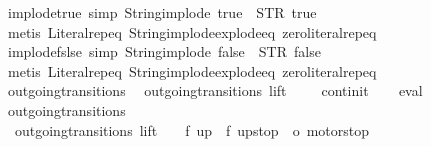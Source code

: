 \begin{isabellebody}
\ implode{\isacharunderscore}true\ {\isacharbrackleft}simp{\isacharbrackright}{\isacharcolon}\ {\isachardoublequoteopen}String{\isachardot}implode\ {\isacharprime}{\isacharprime}true{\isacharprime}{\isacharprime}\ {\isacharequal}\ STR\ {\isacharprime}{\isacharprime}true{\isacharprime}{\isacharprime}{\isachardoublequoteclose}\isanewline
%
\isadelimproof
\ \ %
\endisadelimproof
%
\isatagproof
{}\isamarkupfalse%
\ {\isacharparenleft}metis\ Literal{\isachardot}rep{\isacharunderscore}eq\ String{\isachardot}implode{\isacharunderscore}explode{\isacharunderscore}eq\ zero{\isacharunderscore}literal{\isachardot}rep{\isacharunderscore}eq{\isacharparenright}%
\endisatagproof
{\isafoldproof}%
%
\isadelimproof
\isanewline
%
\endisadelimproof
\isanewline
{}\isamarkupfalse%
\ implode{\isacharunderscore}fslse\ {\isacharbrackleft}simp{\isacharbrackright}{\isacharcolon}\ {\isachardoublequoteopen}String{\isachardot}implode\ {\isacharprime}{\isacharprime}false{\isacharprime}{\isacharprime}\ {\isacharequal}\ STR\ {\isacharprime}{\isacharprime}false{\isacharprime}{\isacharprime}{\isachardoublequoteclose}\isanewline
%
\isadelimproof
\ \ %
\endisadelimproof
%
\isatagproof
{}\isamarkupfalse%
\ {\isacharparenleft}metis\ Literal{\isachardot}rep{\isacharunderscore}eq\ String{\isachardot}implode{\isacharunderscore}explode{\isacharunderscore}eq\ zero{\isacharunderscore}literal{\isachardot}rep{\isacharunderscore}eq{\isacharparenright}%
\endisatagproof
{\isafoldproof}%
%
\isadelimproof
\isanewline
%
\endisadelimproof
\isanewline
{}\isamarkupfalse%
\ outgoing{\isacharunderscore}transitions{\isacharunderscore}{}{\isacharcolon}\isanewline
\ \ {\isachardoublequoteopen}outgoing{\isacharunderscore}transitions\ lift\ {}\ {\isacharequal}\ {\isacharbraceleft}{\isacharbar}{\isacharparenleft}{\isacharparenleft}{}{\isacharcomma}\ {}{\isacharparenright}{\isacharcomma}\ continit{\isacharparenright}{\isacharbar}{\isacharbraceright}{\isachardoublequoteclose}\isanewline
%
\isadelimproof
\ \ %
\endisadelimproof
%
\isatagproof
{}\isamarkupfalse%
\ eval%
\endisatagproof
{\isafoldproof}%
%
\isadelimproof
\isanewline
%
\endisadelimproof
\isanewline
{}\isamarkupfalse%
\ outgoing{\isacharunderscore}transitions{\isacharunderscore}{}{\isacharcolon}\isanewline
\ \ {\isachardoublequoteopen}outgoing{\isacharunderscore}transitions\ lift\ {}\ {\isacharequal}\ {\isacharbraceleft}{\isacharbar}{\isacharparenleft}{\isacharparenleft}{}{\isacharcomma}\ f{}{\isacharparenright}{\isacharcomma}\ up{}{}{\isacharparenright}{\isacharcomma}\ {\isacharparenleft}{\isacharparenleft}{}{\isacharcomma}\ f{}{\isacharparenright}{\isacharcomma}\ up{}{}stop{\isacharparenright}{\isacharcomma}\ {\isacharparenleft}{\isacharparenleft}{}{\isacharcomma}\ o{}{\isacharparenright}{\isacharcomma}\ motorstop\ {}{\isacharparenright}\ {\isacharbar}{\isacharbraceright}{\isachardoublequoteclose}\isanewline

\end{isabellebody}
